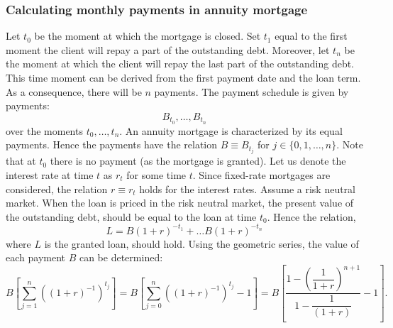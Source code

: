     \subsubsection{Calculating monthly payments in annuity mortgage}
        Let $t_0$ be the moment at which the mortgage is closed.
        Set $t_1$ equal to the first moment the client will repay a 
        part of the outstanding debt. 
        Moreover, let $t_n$ be the moment at which the client will repay the last 
        part of the outstanding debt. This time moment can be derived 
        from the first payment date and the loan term.
        As a consequence, there will be $n$ payments. 
        The payment schedule is given by payments:
        \begin{equation}
            B_{t_0}, \ldots, B_{t_n}
        \end{equation}
        over the moments $t_0, \ldots, t_n$. 
        An annuity mortgage is characterized by its equal payments.
        Hence the payments have the relation $B \equiv B_{t_j}$ for 
        $j \in \{0, 1, \ldots, n\}$. 
        Note that at $t_0$ there is no payment (as the mortgage is granted).
        Let us denote the interest rate at time $t$ as $r_t$ for some time 
        $t$. 
        Since fixed-rate mortgages are considered, the relation $r \equiv r_t$ 
        holds for the interest rates. 
        Assume a risk neutral market. 
        When the loan is priced in the risk 
        neutral market, the present value of the outstanding debt, should be 
        equal to the loan at time $t_0$. Hence the relation,
        \begin{equation}
            L = B (1 + r)^{-t_1} + \ldots B (1 + r)^{-t_n}
        \end{equation}
        where $L$ is the granted loan, should hold. 
        Using the geometric series, the value of each payment 
        $B$ can be determined: 
        \begin{equation}
            B\left[
                \displaystyle\sum_{j=1}^{n} \left(
                    (1 + r)^{-1}
                    \right)^{t_j}  
            \right] = 
            B\left[
                \displaystyle\sum_{j=0}^{n} \left(
                    (1 + r)^{-1}
                    \right)^{t_j} - 1  
            \right] = 
            B \left[
                \dfrac{
                    1 - \left(
                        \dfrac{1}{1 + r}
                    \right)^{n+1}
                    }
                    {
                        1 - \dfrac{1}{(1 + r)}
                    } - 1
            \right].
        \end{equation}
